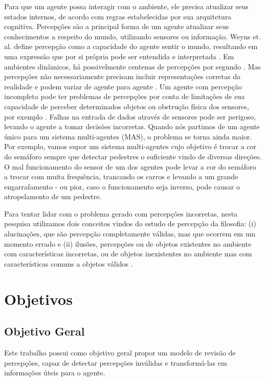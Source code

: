 Para que um agente possa interagir com o ambiente, ele precisa atualizar seus estados internos, de acordo com regras estabelecidas por sua arquitetura cognitiva. Percepções são a principal forma de um agente atualizar seus conhecimentos a respeito do mundo, utilizando sensores ou informação. Weyns et. al. define percepção como a capacidade do agente sentir o mundo, resultando em uma expressão que por si própria pode ser entendida e interpretada \cite{wyens2004}. Em ambientes dinâmicos, há possivelmente centenas de percepções por segundo \cite{hayes1992guardian}. Mas percepções não necessariamente precisam incluir representações corretas da realidade e podem variar de agente para agente \cite{janssen2005agent}. Um agente com percepção incompleta pode ter problemas de percepções por conta de limitações de sua capacidade de perceber determinados objetos ou obstrução física dos sensores, por exemplo \cite{chrisman1991intelligent}. Falhas na entrada de dados através de sensores pode ser perigoso, levando o agente a tomar decisões incorretas. Quando nós partimos de um agente único para um sistema multi-agentes (MAS), o problema se torna ainda maior. Por exemplo, vamos supor um sistema multi-agentes cujo objetivo é trocar a cor do semáforo sempre que detectar pedestres o suficiente vindo de diversas direções. O mal funcionamento do sensor de um dos agentes pode levar a cor do semáforo a trocar com muita frequência, trancando os carros e levando a um grande engarrafamento - ou pior, caso o funcionamento seja inverso, pode causar o atropelamento de um pedestre.

Para tentar lidar com o problema gerado com percepções incorretas, nesta pesquisa utilizamos dois conceitos vindos do estudo de percepção da filosofia: (i) alucinações, que são percepção completamente válidas, mas que ocorrem em um momento errado e (ii) ilusões, percepções ou de objetos existentes no ambiente com características incorretas, ou de objetos inexistentes no ambiente mas com características comuns a objetos válidos \cite{perception-problem}.

\section{Objetivos}

\subsection{Objetivo Geral}

Este trabalho possui como objetivo geral propor um modelo de revisão de percepções, capaz de detectar percepções inválidas e transformá-las em informações úteis para o agente.

